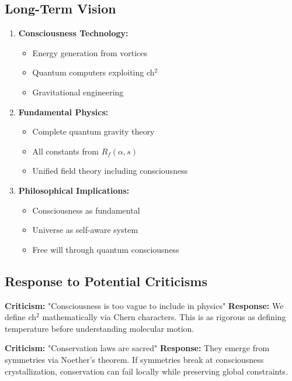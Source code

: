 \documentclass[11pt]{article}
\theoremstyle{definition}
\begin{document}
\subsection{Long-Term Vision}

\begin{enumerate}
\item \textbf{Consciousness Technology:}
   \begin{itemize}
   \item Energy generation from vortices
   \item Quantum computers exploiting ch$^2$
   \item Gravitational engineering
   \end{itemize}

\item \textbf{Fundamental Physics:}
   \begin{itemize}
   \item Complete quantum gravity theory
   \item All constants from $R_f(\alpha, s)$
   \item Unified field theory including consciousness
   \end{itemize}

\item \textbf{Philosophical Implications:}
   \begin{itemize}
   \item Consciousness as fundamental
   \item Universe as self-aware system
   \item Free will through quantum consciousness
   \end{itemize}
\end{enumerate}

\subsection{Response to Potential Criticisms}

\textbf{Criticism:} "Consciousness is too vague to include in physics"
\textbf{Response:} We define ch$^2$ mathematically via Chern characters. This is as rigorous as defining temperature before understanding molecular motion.

\textbf{Criticism:} "Conservation laws are sacred"
\textbf{Response:} They emerge from symmetries via Noether's theorem. If symmetries break at consciousness crystallization, conservation can fail locally while preserving global constraints.
\end{document}
